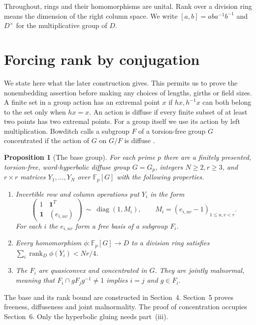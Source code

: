 \documentclass[11pt,a4paper]{article}
\newtheorem{proposition}[theorem]{Proposition}
\numberwithin{equation}{section}
\DeclareMathOperator{\rk}{rank}
\DeclareMathOperator{\diag}{diag}
\newcommand{\F}{\mathbb F}
\newcommand{\one}{\mathbf 1}
\begin{document}
Throughout, rings and their homomorphisms are unital. Rank over a division ring means the dimension of the right column space. We write \([a,b]=aba^{-1}b^{-1}\) and \(D^\times\) for the multiplicative group of \(D\).

\section{Forcing rank by conjugation}

We state here what the later construction gives. This permits us to prove the nonembedding assertion before making any choices of lengths, girths or field sizes. A finite set in a group action has an extremal point \(x\) if \(hx,h^{-1}x\) can both belong to the set only when \(hx=x\). An action is diffuse if every finite subset of at least two points has two extremal points. For a group itself we use its action by left multiplication. Bowditch calls a subgroup \(F\) of a torsion-free group \(G\) concentrated if the action of \(G\) on \(G/F\) is diffuse \cite{r6}.

\begin{proposition}[The base group]\label{prop:base}
For each prime \(p\) there are a finitely presented, torsion-free, word-hyperbolic diffuse group \(G=G_p\), integers \(N\ge2,r\ge3\), and \(r\times r\) matrices \(Y_1,\ldots,Y_N\) over \(\F_p[G]\) with the following properties.
\begin{enumerate}
\item Invertible row and column operations put \(Y_i\) in the form
\begin{equation}\label{eq:normal}
\begin{pmatrix}1&\one^{T}\\ \one&(e_{i,uv})\end{pmatrix}
  \ \sim\ \diag(1,M_i),\qquad M_i=(e_{i,uv}-1)_{1\le u,v<r}.
\end{equation}
For each \(i\) the \(e_{i,uv}\) form a free basis of a subgroup \(F_i\).
\item Every homomorphism \(\phi:\F_p[G]\to D\) to a division ring satisfies \(\sum_i\rk_D\phi(Y_i)<Nr/4\).
\item The \(F_i\) are quasiconvex and concentrated in \(G\). They are jointly malnormal, meaning that \(F_i\cap gF_jg^{-1}\ne1\) implies \(i=j\) and \(g\in F_i\).
\end{enumerate}
\end{proposition}

The base and its rank bound are constructed in Section~4. Section~5 proves freeness, diffuseness and joint malnormality. The proof of concentration occupies Section~6. Only the hyperbolic gluing needs part~(iii).
\end{document}
